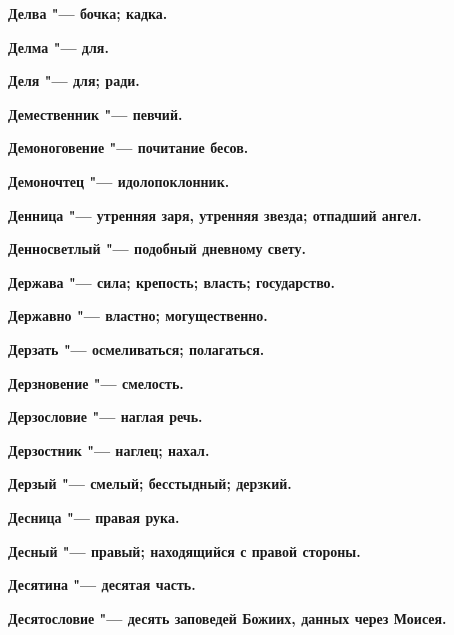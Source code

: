 \bfseries Делва \normalfont{} "--- бочка; кадка. 




\bfseries Делма \normalfont{} "--- для. 




\bfseries Деля \normalfont{} "--- для; ради. 




\bfseries Демественник \normalfont{} "--- певчий. 




\bfseries Демоноговение \normalfont{} "--- почитание бесов. 




\bfseries Демоночтец \normalfont{} "--- идолопоклонник. 




\bfseries Денница \normalfont{} "--- утренняя заря, утренняя звезда; отпадший ангел. 




\bfseries Денносветлый \normalfont{} "--- подобный дневному свету. 




\bfseries Держава \normalfont{} "--- сила; крепость; власть; государство. 




\bfseries Державно \normalfont{} "--- властно; могущественно. 




\bfseries Дерзать \normalfont{} "--- осмеливаться; полагаться. 




\bfseries Дерзновение \normalfont{} "--- смелость. 




\bfseries Дерзословие \normalfont{} "--- наглая речь. 




\bfseries Дерзостник \normalfont{} "--- наглец; нахал. 




\bfseries Дерзый \normalfont{} "--- смелый; бесстыдный; дерзкий. 




\bfseries Десница \normalfont{} "--- правая рука. 




\bfseries Десный \normalfont{} "--- правый; находящийся с правой стороны. 




\bfseries Десятина \normalfont{} "--- десятая часть. 




\bfseries Десятословие \normalfont{} "--- десять заповедей Божиих, данных через Моисея. 




